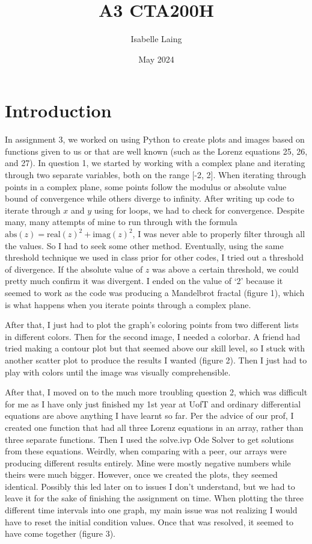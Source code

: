 \documentclass{article}
\title{A3 CTA200H}
\author{Isabelle Laing}
\date{May 2024}
\begin{document}
\maketitle

\section{Introduction}
In assignment 3, we worked on using Python to create plots and images based on functions given to us or that are well known (such as the Lorenz equations 25, 26, and 27). In question 1, we started by working with a complex plane and iterating through two separate variables, both on the range [-2, 2]. When iterating through points in a complex plane, some points follow the modulus or absolute value bound of convergence while others diverge to infinity. After writing up code to iterate through \( x \) and \( y \) using for loops, we had to check for convergence. Despite many, many attempts of mine to run through with the formula \( \text{abs}(z) = \text{real}(z)^2 + \text{imag}(z)^2 \), I was never able to properly filter through all the values. So I had to seek some other method. Eventually, using the same threshold technique we used in class prior for other codes, I tried out a threshold of divergence. If the absolute value of \( z \) was above a certain threshold, we could pretty much confirm it was divergent. I ended on the value of ‘2’ because it seemed to work as the code was producing a Mandelbrot fractal (figure 1), which is what happens when you iterate points through a complex plane. 

After that, I just had to plot the graph's coloring points from two different lists in different colors. Then for the second image, I needed a colorbar. A friend had tried making a contour plot but that seemed above our skill level, so I stuck with another scatter plot to produce the results I wanted (figure 2). Then I just had to play with colors until the image was visually comprehensible. 

After that, I moved on to the much more troubling question 2, which was difficult for me as I have only just finished my 1st year at UofT and ordinary differential equations are above anything I have learnt so far. Per the advice of our prof, I created one function that had all three Lorenz equations in an array, rather than three separate functions. Then I used the solve.ivp Ode Solver to get solutions from these equations. Weirdly, when comparing with a peer, our arrays were producing different results entirely. Mine were mostly negative numbers while theirs were much bigger. However, once we created the plots, they seemed identical. Possibly this led later on to issues I don’t understand, but we had to leave it for the sake of finishing the assignment on time. When plotting the three different time intervals into one graph, my main issue was not realizing I would have to reset the initial condition values. Once that was resolved, it seemed to have come together (figure 3).
\end{document}
